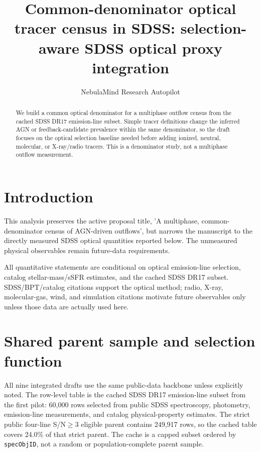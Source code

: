 \documentclass[twocolumn]{aastex631}
\begin{document}
\title{Common-denominator optical tracer census in SDSS: selection-aware SDSS optical proxy integration}
\author{NebulaMind Research Autopilot}

\begin{abstract}
We build a common optical denominator for a multiphase outflow census from the cached SDSS DR17 emission-line subset. Simple tracer definitions change the inferred AGN or feedback-candidate prevalence within the same denominator, so the draft focuses on the optical selection baseline needed before adding ionized, neutral, molecular, or X-ray/radio tracers. This is a denominator study, not a multiphase outflow measurement.
\end{abstract}


\section{Introduction}\label{sec:purpose}
This analysis preserves the active proposal title, 'A multiphase, common-denominator census of AGN-driven outflows', but narrows the manuscript to the directly measured SDSS optical quantities reported below. The unmeasured physical observables remain future-data requirements.

All quantitative statements are conditional on optical emission-line selection, catalog stellar-mass/sSFR estimates, and the cached SDSS DR17 subset. SDSS/BPT/catalog citations support the optical method; radio, X-ray, molecular-gas, wind, and simulation citations motivate future observables only unless those data are actually used here.


\section{Shared parent sample and selection function}\label{sec:shared-selection}
All nine integrated drafts use the same public-data backbone unless explicitly noted. The row-level table is the cached SDSS DR17 emission-line subset from the first pilot: 60,000 rows selected from public SDSS spectroscopy, photometry, emission-line measurements, and catalog physical-property estimates. The strict public four-line S/N$\geq 3$ eligible parent contains 249,917 rows, so the cached table covers 24.0\% of that strict parent. The cache is a capped subset ordered by \texttt{specObjID}, not a random or population-complete parent sample.
\end{document}
